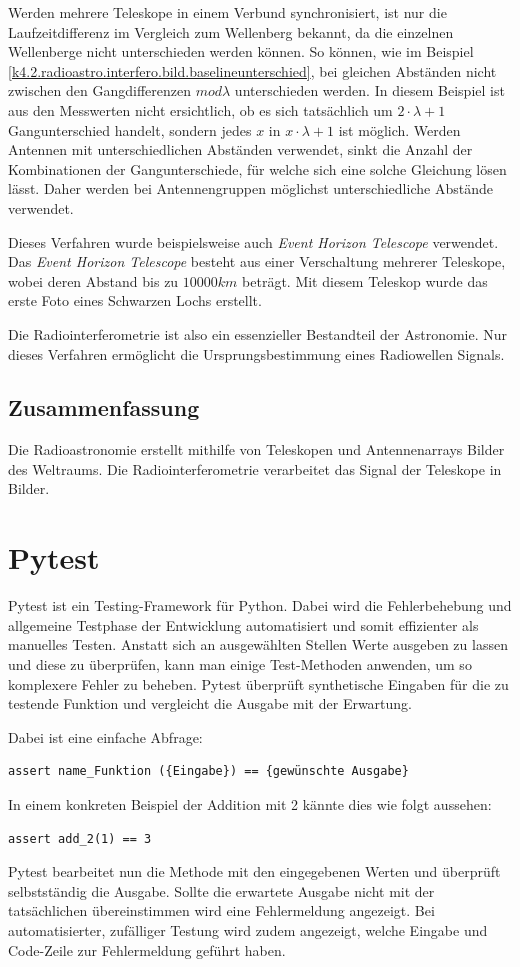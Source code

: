 \documentclass[]{dsadokumentation}
\begin{document}
Werden mehrere Teleskope in einem Verbund synchronisiert, ist nur die Laufzeitdifferenz im Vergleich zum Wellenberg bekannt, da die einzelnen Wellenberge nicht unterschieden werden können. So können, wie im Beispiel  \cref{k4.2.radioastro.interfero.bild.baselineunterschied}, bei gleichen Abständen nicht zwischen den Gangdifferenzen $mod \lambda$ unterschieden werden. In diesem Beispiel ist aus den Messwerten nicht ersichtlich, ob es sich tatsächlich um $2\cdot \lambda +1$ Gangunterschied handelt, sondern jedes $x$ in $x\cdot\lambda+1$ ist möglich. Werden Antennen mit unterschiedlichen Abständen verwendet, sinkt die Anzahl der Kombinationen der Gangunterschiede, für welche sich eine solche Gleichung lösen lässt. Daher werden bei Antennengruppen möglichst unterschiedliche Abstände verwendet.

Dieses Verfahren wurde beispielsweise auch \emph{Event Horizon Telescope} verwendet. Das \emph{Event Horizon Telescope} besteht aus einer Verschaltung mehrerer Teleskope, wobei deren Abstand bis zu $10000km$ beträgt. Mit diesem Teleskop wurde das erste Foto eines Schwarzen Lochs erstellt.

Die Radiointerferometrie ist also ein essenzieller Bestandteil der Astronomie. Nur dieses Verfahren ermöglicht die Ursprungsbestimmung eines Radiowellen Signals.

\subsection{Zusammenfassung}
Die Radioastronomie erstellt mithilfe von Teleskopen und Antennenarrays Bilder des Weltraums. Die Radiointerferometrie verarbeitet das Signal der Teleskope in Bilder.

\section{Pytest}
Pytest ist ein Testing-Framework für Python. Dabei wird die Fehlerbehebung und allgemeine Testphase der Entwicklung automatisiert und somit effizienter als manuelles Testen. Anstatt sich an ausgewählten Stellen Werte ausgeben zu lassen und diese zu überprüfen, kann man einige Test-Methoden anwenden, um so komplexere Fehler zu beheben. Pytest überprüft synthetische Eingaben für die zu testende Funktion und vergleicht die Ausgabe mit der Erwartung.

Dabei ist eine einfache Abfrage:

\begin{verbatim}
assert name_Funktion ({Eingabe}) == {gewünschte Ausgabe}
\end{verbatim}
In einem konkreten Beispiel der Addition mit 2 kännte dies wie folgt aussehen:
\begin{verbatim}
assert add_2(1) == 3
\end{verbatim}
Pytest bearbeitet nun die Methode mit den eingegebenen Werten und überprüft selbstständig die Ausgabe. Sollte die erwartete Ausgabe nicht mit der tatsächlichen übereinstimmen wird eine Fehlermeldung angezeigt. Bei automatisierter, zufälliger Testung wird zudem angezeigt, welche Eingabe und Code-Zeile zur Fehlermeldung geführt haben.
\end{document}
